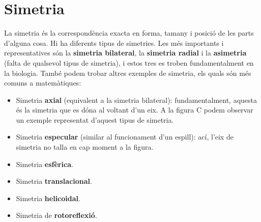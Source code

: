 \documentclass[12pt,a4paper]{article}
\begin{document}
\begin{figure}[h]
	\centering
\end{figure}

\section{Simetria}

La simetria és la correspondència exacta en forma, tamany i posició de les parts d'alguna cosa. Hi ha diferents tipus de simetries. Les més importants i representatives són la \textbf{simetria bilateral}, la \textbf{simetria radial} i la \textbf{asimetria} (falta de qualsevol tipus de simetria), i estos tres es troben fundamentalment en la biologia. També podem trobar altres exemples de simetria, els quals són més comuns a matemàtiques:

\begin{itemize}
	\item Simetria \textbf{axial} (equivalent a la simetria bilateral): fundamentalment, aquesta és la simetria que es dóna al voltant d'un eix. A la figura C podem observar un exemple representat d'aquest tipus de simetria.
	\item Simetria \textbf{especular} (similar al funcionament d'un espill): ací, l'eix de simetria no talla en cap moment a la figura.
	\item Simetria \textbf{esfèrica}.
	\item Simetria \textbf{translacional}.
	\item Simetria \textbf{helicoidal}.
	\item Simetria de \textbf{rotoreflexió}.
\end{itemize}

\begin{figure}[h]
	\centering
\end{figure}
\end{document}
